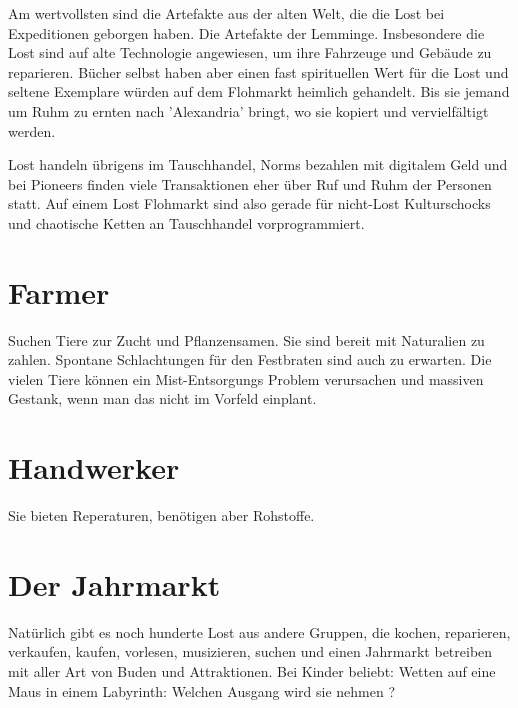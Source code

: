 Am wertvollsten sind die Artefakte aus der alten Welt, die die Lost bei Expeditionen geborgen haben. Die Artefakte der Lemminge. Insbesondere die Lost sind auf alte Technologie angewiesen, um ihre Fahrzeuge und Gebäude zu reparieren. Bücher selbst haben aber einen fast spirituellen Wert für die Lost und seltene Exemplare würden auf dem Flohmarkt heimlich gehandelt. Bis sie jemand um Ruhm zu ernten nach 'Alexandria' bringt, wo sie kopiert und vervielfältigt werden.

Lost handeln übrigens im Tauschhandel, Norms bezahlen mit digitalem Geld und bei Pioneers finden viele Transaktionen eher über Ruf und Ruhm der Personen statt. Auf einem Lost Flohmarkt sind also gerade für nicht-Lost Kulturschocks und chaotische Ketten an Tauschhandel vorprogrammiert.

\section{Farmer}

Suchen Tiere zur Zucht und Pflanzensamen. Sie sind bereit mit Naturalien zu zahlen. Spontane Schlachtungen für den Festbraten sind auch zu erwarten. Die vielen Tiere können ein Mist-Entsorgungs Problem verursachen und massiven Gestank, wenn man das nicht im Vorfeld einplant.

\section{Handwerker}

Sie bieten Reperaturen, benötigen aber Rohstoffe.

\section{Der Jahrmarkt}

Natürlich gibt es noch hunderte Lost aus andere Gruppen, die kochen, reparieren, verkaufen, kaufen, vorlesen, musizieren, suchen und einen Jahrmarkt betreiben mit aller Art von Buden und Attraktionen. Bei Kinder beliebt: Wetten auf eine Maus in einem Labyrinth: Welchen Ausgang wird sie nehmen ?


